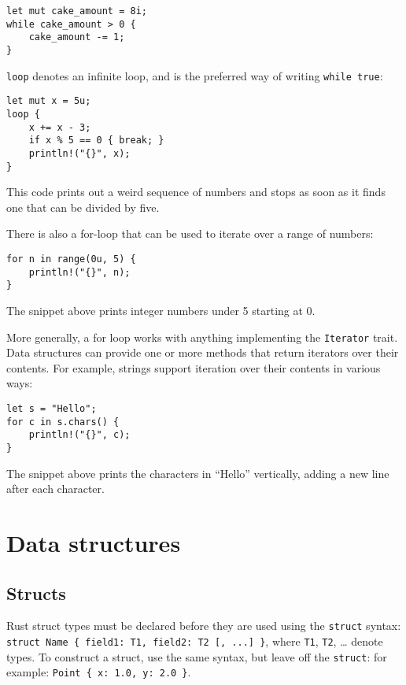 \documentclass[]{article}
\begin{document}
\begin{verbatim}
let mut cake_amount = 8i;
while cake_amount > 0 {
    cake_amount -= 1;
}
\end{verbatim}

\texttt{loop} denotes an infinite loop, and is the preferred way of
writing \texttt{while true}:

\begin{verbatim}
let mut x = 5u;
loop {
    x += x - 3;
    if x % 5 == 0 { break; }
    println!("{}", x);
}
\end{verbatim}

This code prints out a weird sequence of numbers and stops as soon as it
finds one that can be divided by five.

There is also a for-loop that can be used to iterate over a range of
numbers:

\begin{verbatim}
for n in range(0u, 5) {
    println!("{}", n);
}
\end{verbatim}

The snippet above prints integer numbers under 5 starting at 0.

More generally, a for loop works with anything implementing the
\texttt{Iterator} trait. Data structures can provide one or more methods
that return iterators over their contents. For example, strings support
iteration over their contents in various ways:

\begin{verbatim}
let s = "Hello";
for c in s.chars() {
    println!("{}", c);
}
\end{verbatim}

The snippet above prints the characters in ``Hello'' vertically, adding
a new line after each character.

\section{Data structures}\label{data-structures}

\subsection{Structs}\label{structs}

Rust struct types must be declared before they are used using the
\texttt{struct} syntax:
\texttt{struct Name \{ field1: T1, field2: T2 {[}, ...{]} \}}, where
\texttt{T1}, \texttt{T2}, \ldots{} denote types. To construct a struct,
use the same syntax, but leave off the \texttt{struct}: for example:
\texttt{Point \{ x: 1.0, y: 2.0 \}}.
\end{document}

